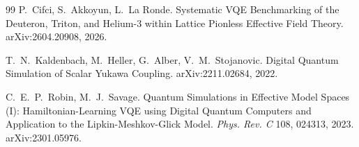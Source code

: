 \documentclass[11pt]{article}
\begin{document}
\begin{thebibliography}{99}
 P.~Cifci, S.~Akkoyun, L.~La Ronde. Systematic VQE Benchmarking of the Deuteron,
Triton, and Helium-3 within Lattice Pionless Effective Field Theory. arXiv:2604.20908, 2026.

 T.~N.~Kaldenbach, M.~Heller, G.~Alber, V.~M.~Stojanovic. Digital Quantum Simulation
of Scalar Yukawa Coupling. arXiv:2211.02684, 2022.

 C.~E.~P.~Robin, M.~J.~Savage. Quantum Simulations in Effective Model Spaces (I):
Hamiltonian-Learning VQE using Digital Quantum Computers and Application to the Lipkin-Meshkov-Glick Model.
\emph{Phys. Rev. C} 108, 024313, 2023. arXiv:2301.05976.

\end{thebibliography}
\end{document}

